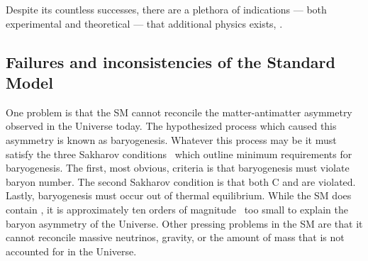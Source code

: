 Despite its countless successes, there are a plethora of indications --- both
experimental and theoretical --- that additional physics exists, \bsm.



\subsection{Failures and inconsistencies of the Standard Model}
\label{sec:bsm:fail}
One problem is that the SM cannot reconcile the matter-antimatter asymmetry observed in the
Universe today.
The hypothesized process which caused this asymmetry is known as baryogenesis.
Whatever this process may be it must satisfy the three Sakharov
conditions~\cite{1991SvPhU..34..392S} which outline minimum requirements for baryogenesis.
The first, most obvious, criteria is that baryogenesis must violate baryon number.
The second Sakharov condition is that both C and \CP are violated.
Lastly, baryogenesis must occur out of thermal equilibrium.
While the SM does contain \CPV, it is approximately ten orders of
magnitude~\cite{Cline:2006ts,Huet:1994jb} too small to explain the baryon asymmetry of the
Universe.
Other pressing problems in the SM are that it cannot reconcile massive neutrinos, gravity, or the
amount of mass that is not accounted for in the Universe.


